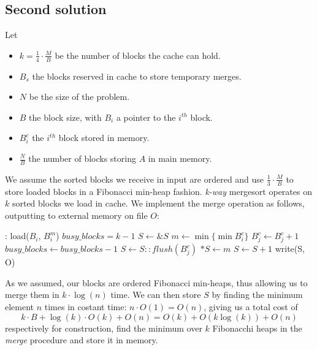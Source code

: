 \subsection{Second solution}
Let
    \begin{itemize}
    \item $k = \frac{1}{4}\cdot \frac{M}{B}$ be the number of blocks the cache can hold.
    \item $B_s$ the blocks reserved in cache to store temporary merges.
    \item $N$ be the size of the problem.
    \item $B$ the block size, with $B_i$ a pointer to the $i^{th}$ block.
    \item $B_{i}^{c}$ the $i^{th}$ block stored in memory.
    \item $\frac{N}{B}$ the number of blocks storing $A$ in main memory.
    \end{itemize}
We assume the sorted blocks we receive in input are ordered and use $\frac{1}{3} \cdot \frac{M}{B}$ to store loaded blocks in a Fibonacci min-heap fashion.
\emph{k-way} mergesort operates on $k$ sorted blocks we load in cache.
We implement the merge operation as follows, outputting to external memory on file $O$:
    \begin{algorithmic}[1]
    :
        \State load($B_i$, $B_i^m$)\;           
    \EndFor
    \State $busy\_blocks = k - 1$\;             
    \State $S \gets \&S$\;                      
        \State $m \gets \min\{\min{B_i^c}\}$\;  
        \State $B_j^c \gets B_j^c + 1$\;        
            \State $busy\_blocks \gets busy\_blocks - 1$\;
        \EndIf
            \State $S \gets S :: flush(B_j^c)$\;    
        \EndIf
        \State $*S \gets m$\;
        \State $S \gets S + 1$\;                
    \EndWhile
    \State write(S, O)\;                        
    \EndFunction
\end{algorithmic}

As we assumed, our blocks are ordered Fibonacci min-heaps, thus allowing us to merge them in $k \cdot \log(n)$ time.
We can then store $S$ by finding the minimum element $n$ times in costant time: $n \cdot O(1) = O(n)$, giving us a total cost of
    \begin{equation*}
    k \cdot B + \log(k) \cdot O(k) + O(n) = O(k) + O(k \log(k)) + O(n)
    \end{equation*}
respectively for construction, find the minimum over $k$ Fibonacchi heaps in the \emph{merge} procedure and store it in memory.
